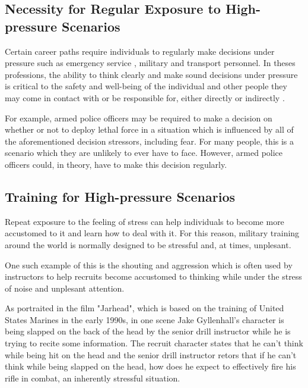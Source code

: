 \documentclass[12pt]{article}
\begin{document}
\subsection{Necessity for Regular Exposure to High-pressure Scenarios}

Certain career paths require individuals to regularly make decisions under pressure such as emergency service \cite{gullon2024prevalence}\cite{smith2011work}, military \cite{srivastava2023occupational}\cite{hellewell2018measuring}\cite{fear2009job} and transport \cite{jiao2023physiological}\cite{cahill2021pilot} personnel. In theses professions, the ability to think clearly and make sound decisions under pressure is critical to the safety and well-being of the individual and other people they may come in contact with or be responsible for, either directly or indirectly \cite{mcfarlane2021investigating}. 

For example, armed police officers may be required to make a decision on whether or not to deploy lethal force in a situation which is influenced by all of the aforementioned decision stressors, including fear. For many people, this is a scenario which they are unlikely to ever have to face. However, armed police officers could, in theory, have to make this decision regularly. 



\subsection{Training for High-pressure Scenarios}

Repeat exposure to the feeling of stress can help individuals to become more accustomed to it and learn how to deal with it. For this reason, military training around the world is normally designed to be stressful and, at times, unplesant. 

One such example of this is the shouting and aggression which is often used by instructors to help recruits become accustomed to thinking while under the stress of noise and unplesant attention.

As portraited in the film "Jarhead", which is based on the training of United States Marines in the early 1990s, in one scene Jake Gyllenhall's character is being slapped on the back of the head by the senior drill instructor while he is trying to recite some information. The recruit character states that he can't think while being hit on the head and the senior drill instructor retors that if he can't think while being slapped on the head, how does he expect to effectively fire his rifle in combat, an inherently stressful situation.
\end{document}
